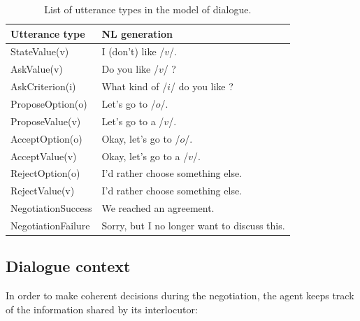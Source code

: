 \documentclass[runningheads,a4paper]{llncs}
\begin{document}
	
	\begin{table}[t]
		
		\begin{tabular} {|p{4.5cm}|p{6cm}|}
			\hline
			\textbf{Utterance type}  &\textbf{ NL generation} \\
			\hline
			StateValue(v) &  I (don't) like /$v$/. \\
			\hline
			AskValue(v)& Do you like /$v$/ ? \\
			
			AskCriterion(i) &  What kind of /$i$/ do you like ? \\
			\hline
			ProposeOption(o)  & Let's go to /$o$/.\\
			
			ProposeValue(v) & Let's go to a /$v$/.\\
			\hline
			AcceptOption(o)& Okay, let's go to /$o$/.\\
			
			AcceptValue(v) & Okay, let's go to a /$v$/.\\
			\hline
			RejectOption(o) & I'd rather choose  something else.\\
			
			RejectValue(v) &  I'd rather choose  something else.\\
			\hline
			NegotiationSuccess &  We reached an agreement.\\
			\cline{1-2}
			NegotiationFailure &  Sorry, but I no longer want to discuss this.\\
			\hline
		\end{tabular}
		
		\caption{\label{table:utt}List of utterance types in the model of dialogue.}
	\end{table}
	
	
	\subsection{Dialogue context}
	In order to make coherent decisions during the negotiation, the agent keeps track of the information shared by its interlocutor:
	
\end{document}
